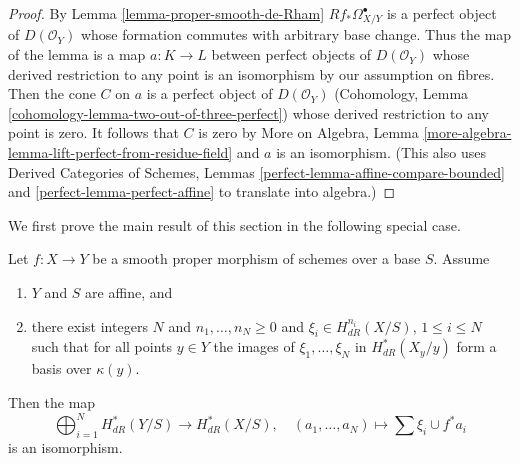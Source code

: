 \begin{proof}
By Lemma \ref{lemma-proper-smooth-de-Rham}
$Rf_*\Omega^\bullet_{X/Y}$ is a perfect object of $D(\mathcal{O}_Y)$
whose formation commutes with arbitrary base change.
Thus the map of the lemma is a map $a : K \to L$
between perfect objects of $D(\mathcal{O}_Y)$
whose derived restriction to any point is an isomorphism
by our assumption on fibres. Then the cone $C$ on $a$ is a perfect
object of $D(\mathcal{O}_Y)$ (Cohomology, Lemma
\ref{cohomology-lemma-two-out-of-three-perfect}) whose
derived restriction to any point is zero. It follows that $C$
is zero by More on Algebra, Lemma
\ref{more-algebra-lemma-lift-perfect-from-residue-field}
and $a$ is an isomorphism. (This also uses Derived Categories of Schemes,
Lemmas \ref{perfect-lemma-affine-compare-bounded} and
\ref{perfect-lemma-perfect-affine} to translate into algebra.)
\end{proof}

\noindent
We first prove the main result of this section in the
following special case.

\begin{lemma}
\label{lemma-global-generation-on-fibres}
Let $f : X \to Y$ be a smooth proper morphism of schemes over a base $S$.
Assume
\begin{enumerate}
\item $Y$ and $S$ are affine, and
\item there exist integers $N$ and $n_1, \ldots, n_N \geq 0$ and
$\xi_i \in H^{n_i}_{dR}(X/S)$, $1 \leq i \leq N$ such that
for all points $y \in Y$ the images of $\xi_1, \ldots, \xi_N$
in $H^*_{dR}(X_y/y)$ form a basis over $\kappa(y)$.
\end{enumerate}
Then the map
$$
\bigoplus\nolimits_{i = 1}^N H^*_{dR}(Y/S) \longrightarrow
H^*_{dR}(X/S), \quad
(a_1, \ldots, a_N) \longmapsto  \sum \xi_i \cup f^*a_i
$$
is an isomorphism.
\end{lemma}

